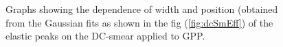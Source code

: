 \begin{figure}[H]
\centering
{}
\label{fig:ParsVsm} %
\caption[DC-smearing effects on elastic peak]{Graphs showing the dependence of width and position (obtained from the Gaussian fits as shown in the fig (\ref{fig:dcSmEff}) of the elastic peaks on the DC-smear applied to GPP.}
\end{figure}


